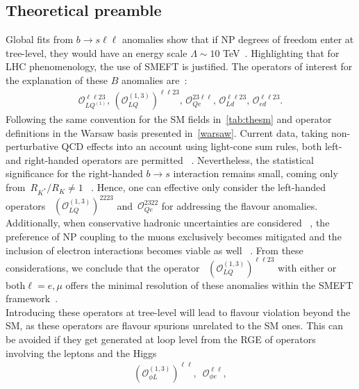 \subsection{Theoretical preamble}
Global fits from $ b \to s \ell \ell$ anomalies show that  if NP degrees of freedom  enter at tree-level, they would have an energy scale $ \Lambda \sim 10$ TeV~\cite{DAmico:2017mtc,Geng:2017svp,Capdevila:2017bsm,Ciuchini:2017mik,Hiller:2017bzc}. Highlighting that for LHC phenomenology, the use of SMEFT is justified.  The operators of interest for the explanation of these $B$ anomalies are~\cite{Celis:2017doq,Ciuchini:2019usw,Aebischer:2019mlg}: 
\begin{eqnarray}
	\label{eq:tree_LUV_SMEFT}
	\mathcal{O}_{LQ^{(1)}}^{\ell \ell 23}, \,	(\mathcal{O}_{LQ}^{(1,3)})^{\ell \ell 23}, \, \mathcal{O}_{Qe}^{23 \ell \ell}, \,  \mathcal{O}_{Ld}^{ \ell \ell 23}, \, \mathcal{O}_{ed}^{\ell \ell 23 }.
\end{eqnarray}
Following the same convention for the SM fields in~\autoref{tab:thesm} and operator definitions in the Warsaw basis presented in~\autoref{warsaw}.  Current data, taking non-perturbative QCD effects into an account using light-cone sum rules, both left- and right-handed operators are permitted ~\cite{Ciuchini:2019usw,Alok:2019ufo,Alguero:2019ptt,Kowalska:2019ley}. Nevertheless, the statistical significance for the right-handed $b \to s$ interaction remains small, coming only from~$R_{K^{*}}/R_{K} \neq 1$ ~\cite{Hiller:2017bzc,Ciuchini:2019usw}. Hence, one can effective only consider the left-handed operators ~$(	\mathcal{O}_{LQ}^{(1,3)} )^{22 23}$ and~$\mathcal{O}_{Qe}^{23 22}$ for addressing the flavour anomalies. Additionally, when conservative hadronic uncertainties are considered ~\cite{Jager:2014rwa,Ciuchini:2015qxb,Arbey:2018ics}, the preference of NP coupling to the muons exclusively becomes mitigated and the inclusion of electron interactions becomes viable as well ~\cite{Ciuchini:2017mik}. From these considerations, we conclude that the operator ~$(	\mathcal{O}_{LQ}^{(1,3)} )^{\ell \ell 23}$ with either or both$ \ell=e, \mu$  offers the minimal resolution of these anomalies within the SMEFT framework~\cite{Ciuchini:2019usw}.\\
Introducing these operators at tree-level will lead to flavour violation beyond the SM, as these operators are flavour spurions unrelated to the SM ones. This can be avoided if they get generated at loop level from the RGE of operators involving the leptons and the Higgs~\cite{Celis:2017doq} 
\begin{eqnarray} 
	\label{eq:SMEFT_op_HL}
	(	\mathcal{O}_{\phi L}^{(1,3)})^{\ell \ell},	\,\,\, 	\mathcal{O}_{\phi e}^{\ell \ell},
\end{eqnarray}
